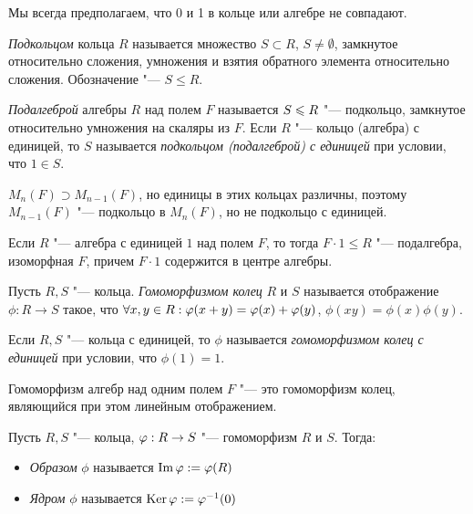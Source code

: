 \begin{note}
	Мы всегда предполагаем, что 0 и 1 в кольце или алгебре не совпадают.
\end{note}

\begin{definition}
	\textit{Подкольцом} кольца $R$ называется множество $S \subset R$, $S \ne \emptyset$, замкнутое относительно сложения, умножения и взятия обратного элемента относительно сложения. Обозначение "--- $S \le R$.
	
	\textit{Подалгеброй} алгебры $R$ над полем $F$ называется $S \hm\le R$ "--- подкольцо, замкнутое относительно умножения на скаляры из $F$. Если $R$ "--- кольцо (алгебра) с единицей, то $S$ называется \textit{подкольцом (подалгеброй) с единицей} при условии, что $1 \in S$.
\end{definition}

\begin{note}
	$M_n(F) \supset M_{n - 1}(F)$, но единицы в этих кольцах различны, поэтому $M_{n-1}(F)$ "--- подкольцо в $M_n(F)$, но не подкольцо с единицей.
\end{note}

\begin{note}
	Если $R$ "--- алгебра с единицей $1$ над полем $F$, то тогда $F \cdot 1 \le R$ "--- подалгебра, изоморфная $F$, причем $F \cdot 1$ содержится в центре алгебры.
\end{note}

\begin{definition}
	Пусть $R, S$ "--- кольца. \textit{Гомоморфизмом колец} $R$ и $S$ называется отображение $\phi: R \to S$ такое, что $\forall x, y \in R: \phi(x + y) \hm= \phi(x) + \phi(y)$, $\phi(xy) = \phi(x)\phi(y)$.
	
	Если $R, S$ "--- кольца с единицей, то $\phi$ называется \textit{гомоморфизмом колец с единицей} при условии, что $\phi(1) = 1$.
\end{definition}

\begin{note}
	Гомоморфизм алгебр над одним полем $F$ "--- это гомоморфизм колец, являющийся при этом линейным отображением.
\end{note}

\begin{definition}
	Пусть $R, S$ "--- кольца, $\phi : R \hm\to S$ "--- гомоморфизм $R$ и $S$. Тогда:
	\begin{itemize}
		\item \textit{Образом} $\phi$ называется $\operatorname{Im}\varphi := \varphi(R)$
		\item \textit{Ядром} $\phi$ называется $\operatorname{Ker}\varphi := \varphi^{-1}(0)$
	\end{itemize}
\end{definition}

